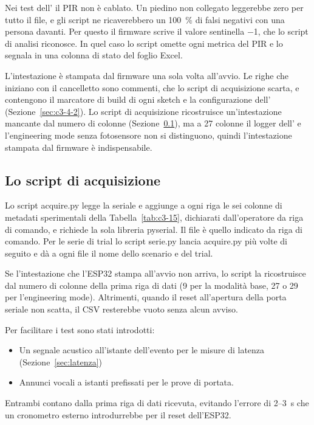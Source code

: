 Nei test dell'\ldc{} il PIR non è cablato. Un piedino non collegato leggerebbe zero per tutto il file, e gli script ne ricaverebbero un 100~\% di falsi negativi con una persona davanti. Per questo il firmware scrive il valore sentinella \(-\)1, che lo script di analisi riconosce. In quel caso lo script omette ogni metrica del PIR e lo segnala in una colonna di stato del foglio Excel.

L'intestazione è stampata dal firmware una sola volta all'avvio. Le righe che iniziano con il cancelletto sono commenti, che lo script di acquisizione scarta, e contengono il marcatore di build di ogni sketch e la configurazione dell'\ldc{} (Sezione~\ref{sec:c3-4-2}). Lo script di acquisizione ricostruisce un'intestazione mancante dal numero di colonne (Sezione~\ref{sec:c3-4-4}), ma a 27 colonne il logger dell'\ldc{} e l'engineering mode senza fotosensore non si distinguono, quindi l'intestazione stampata dal firmware è indispensabile.

\subsection{Lo script di acquisizione}
\label{sec:c3-4-4}

Lo script acquire.py legge la seriale e aggiunge a ogni riga le sei colonne di metadati sperimentali della Tabella~\ref{tab:c3-15}, dichiarati dall'operatore da riga di comando, e richiede la sola libreria pyserial. Il file è quello indicato da riga di comando. Per le serie di trial lo script serie.py lancia acquire.py più volte di seguito e dà a ogni file il nome dello scenario e del trial.

Se l'intestazione che l'ESP32 stampa all'avvio non arriva, lo script la ricostruisce dal numero di colonne della prima riga di dati (9 per la modalità base, 27 o 29 per l'engineering mode). Altrimenti, quando il reset all'apertura della porta seriale non scatta, il CSV resterebbe vuoto senza alcun avviso.

Per facilitare i test sono stati introdotti:

\begin{itemize}
  \item Un segnale acustico all'istante dell'evento per le misure di latenza (Sezione~\ref{sec:latenza})
  \item Annunci vocali a istanti prefissati per le prove di portata.
\end{itemize}

Entrambi contano dalla prima riga di dati ricevuta, evitando l'errore di 2--3~s che un cronometro esterno introdurrebbe per il reset dell'ESP32.

